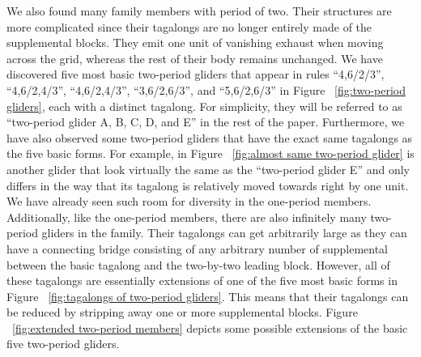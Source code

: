 \documentclass[12pt]{article}
\numberwithin{figure}{section} %
\begin{document}
We also found many family members with period of two. Their structures are more complicated since their tagalongs are no longer entirely made of the supplemental blocks. They emit one unit of vanishing exhaust when moving across the grid, whereas the rest of their body remains unchanged. We have discovered five most basic two-period gliders that appear in rules “4,6/2/3”, “4,6/2,4/3”, “4,6/2,4/3”, “3,6/2,6/3”, and “5,6/2,6/3” in Figure ~\ref{fig:two-period gliders}, each with a distinct tagalong. For simplicity, they will be referred to as “two-period glider A, B, C, D, and E” in the rest of the paper. Furthermore, we have also observed some two-period gliders that have the exact same tagalongs as the five basic forms. For example, in Figure ~\ref{fig:almost same two-period glider} is another glider that look virtually the same as the “two-period glider E” and only differs in the way that its tagalong is relatively moved towards right by one unit. We have already seen such room for diversity in the one-period members. Additionally, like the one-period members, there are also infinitely many two-period gliders in the family. Their tagalongs can get arbitrarily large as they can have a connecting bridge consisting of any arbitrary number of supplemental between the basic tagalong and the two-by-two leading block. However, all of these tagalongs are essentially extensions of one of the five most basic forms in Figure ~\ref{fig:tagalongs of two-period gliders}. This means that their tagalongs can be reduced by stripping away one or more supplemental blocks. Figure ~\ref{fig:extended two-period members} depicts some possible extensions of the basic five two-period gliders. 
\end{document}

